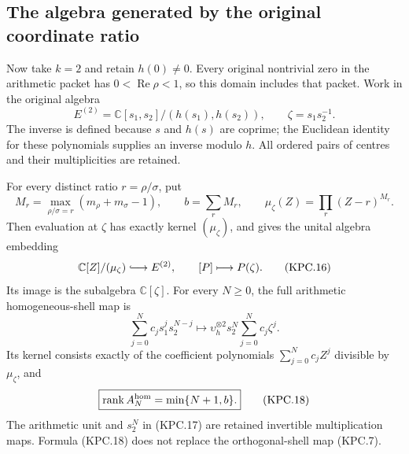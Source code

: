 \subsection{The algebra generated by the original coordinate ratio}

Now take \(k=2\) and retain \(h(0)\ne0\).  Every original
nontrivial zero in the arithmetic packet has \(0<\operatorname{Re}\rho<1\),
so this domain includes that packet.  Work in the original algebra
\[
 E^{(2)}=\mathbb C[s_1,s_2]/(h(s_1),h(s_2)),\qquad
 \zeta=s_1s_2^{-1}.
 \tag{KPC.14}
\]
The inverse is defined because \(s\) and \(h(s)\) are
coprime; the Euclidean identity for these polynomials supplies
an inverse modulo \(h\).  All ordered pairs of centres and
their multiplicities are retained.

\begin{theorem}
For every distinct ratio \(r=\rho/\sigma\), put
\[
 M_r=\max_{\rho/\sigma=r}(m_\rho+m_\sigma-1),\qquad
 b=\sum_r M_r,\qquad
 \mu_\zeta(Z)=\prod_r(Z-r)^{M_r}.
 \tag{KPC.15}
\]
Then evaluation at \(\zeta\) has exactly kernel
\((\mu_\zeta)\), and gives the unital algebra embedding
\[
 \mathbb C[Z]/(\mu_\zeta)
       \lhook\joinrel\longrightarrow E^{(2)},
       \qquad [P]\longmapsto P(\zeta).
 \tag{KPC.16}
\]
Its image is the subalgebra \(\mathbb C[\zeta]\).
For every \(N\ge0\), the full arithmetic homogeneous-shell map is
\[
 \sum_{j=0}^N c_j s_1^j s_2^{N-j}
   \longmapsto
    \upsilon_h^{\otimes2}s_2^N\sum_{j=0}^N c_j\zeta^j.
 \tag{KPC.17}
\]
Its kernel consists exactly of the coefficient polynomials
\(\sum_{j=0}^Nc_jZ^j\) divisible by \(\mu_\zeta\), and
\[
 \boxed{\operatorname{rank}A_N^{\rm hom}=\min\{N+1,b\}.}
 \tag{KPC.18}
\]
The arithmetic unit and \(s_2^N\) in (KPC.17) are retained
invertible multiplication maps.  Formula (KPC.18) does not replace
the orthogonal-shell map (KPC.7).
\end{theorem}

